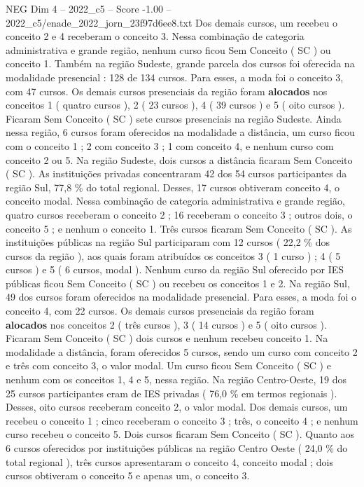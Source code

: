 \begin{textsample}{NEG Dim 4 – 2022\_c5 – Score -1.00 – 2022\_c5/enade\_2022\_jorn\_23f97d6ee8.txt}
Dos demais cursos, um recebeu o conceito 2 e 4 receberam o conceito 3.
Nessa combinação de categoria administrativa e grande região, nenhum curso ficou Sem Conceito ( SC ) ou conceito 1.
Também na região Sudeste, grande parcela dos cursos foi oferecida na modalidade presencial : 128 de 134 cursos.
Para esses, a moda foi o conceito 3, com 47 cursos.
Os demais cursos presenciais da região foram \textbf{alocados} nos conceitos 1 ( quatro cursos ), 2 ( 23 cursos ), 4 ( 39 cursos ) e 5 ( oito cursos ).
Ficaram Sem Conceito ( SC ) sete cursos presenciais na região Sudeste.
Ainda nessa região, 6 cursos foram oferecidos na modalidade a distância, um curso ficou com o conceito 1 ; 2 com conceito 3 ; 1 com conceito 4, e nenhum curso com conceito 2 ou 5.
Na região Sudeste, dois cursos a distância ficaram Sem Conceito ( SC ).
As instituições privadas concentraram 42 dos 54 cursos participantes da região Sul, 77,8 \% do total regional.
Desses, 17 cursos obtiveram conceito 4, o conceito modal.
Nessa combinação de categoria administrativa e grande região, quatro cursos receberam o conceito 2 ; 16 receberam o conceito 3 ; outros dois, o conceito 5 ; e nenhum o conceito 1.
Três cursos ficaram Sem Conceito ( SC ).
As instituições públicas na região Sul participaram com 12 cursos ( 22,2 \% dos cursos da região ), aos quais foram atribuídos os conceitos 3 ( 1 curso ) ; 4 ( 5 cursos ) e 5 ( 6 cursos, modal ).
Nenhum curso da região Sul oferecido por IES públicas ficou Sem Conceito ( SC ) ou recebeu os conceitos 1 e 2.
Na região Sul, 49 dos cursos foram oferecidos na modalidade presencial.
Para esses, a moda foi o conceito 4, com 22 cursos.
Os demais cursos presenciais da região foram \textbf{alocados} nos conceitos 2 ( três cursos ), 3 ( 14 cursos ) e 5 ( oito cursos ).
Ficaram Sem Conceito ( SC ) dois cursos e nenhum recebeu conceito 1.
Na modalidade a distância, foram oferecidos 5 cursos, sendo um curso com conceito 2 e três com conceito 3, o valor modal.
Um curso ficou Sem Conceito ( SC ) e nenhum com os conceitos 1, 4 e 5, nessa região.
Na região Centro-Oeste, 19 dos 25 cursos participantes eram de IES privadas ( 76,0 \% em termos regionais ).
Desses, oito cursos receberam conceito 2, o valor modal.
Dos demais cursos, um recebeu o conceito 1 ; cinco receberam o conceito 3 ; três, o conceito 4 ; e nenhum curso recebeu o conceito 5.
Dois cursos ficaram Sem Conceito ( SC ).
Quanto aos 6 cursos oferecidos por instituições públicas na região Centro Oeste ( 24,0 \% do total regional ), três cursos apresentaram o conceito 4, conceito modal ; dois cursos obtiveram o conceito 5 e apenas um, o conceito 3.

\end{textsample}
